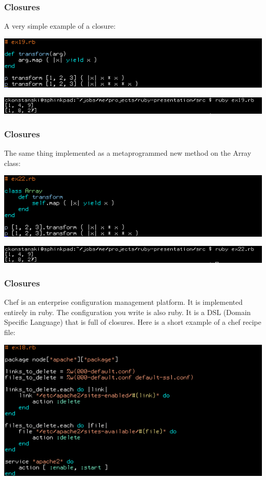 \documentclass[helvetica,english,utf8,notitle,nologo]{beamer}
\begin{document}
\begin{frame}
  \frametitle{Closures}

  A very simple example of a closure:

  \includegraphics[scale=0.53]{src_19}

  \includegraphics[scale=0.5]{out_19}
\end{frame}

\begin{frame}
  \frametitle{Closures}

  The same thing implemented as a metaprogrammed new method on the
  Array class:

  \includegraphics[scale=0.53]{src_22}

  \includegraphics[scale=0.5]{out_22}
\end{frame}

\begin{frame}
  \frametitle{Closures}

  Chef is an enterprise configuration management platform. It is
  implemented entirely in ruby. The configuration you write is also
  ruby. It is a DSL (Domain Specific Language) that is full of
  closures. Here is a short example of a chef recipe file:

  \includegraphics[scale=0.53]{src_18}
\end{frame}
\end{document}
